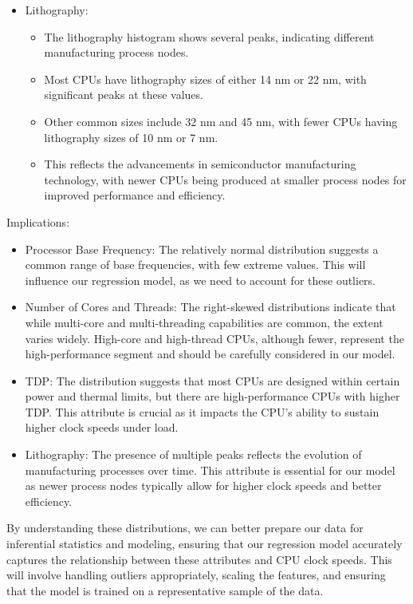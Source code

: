 \begin{itemize}
    \item Lithography: 
    \begin{itemize}
        \item The lithography histogram shows several peaks, indicating different manufacturing process nodes.
        \item Most CPUs have lithography sizes of either 14 nm or 22 nm, with significant peaks at these values. 
        \item Other common sizes include 32 nm and 45 nm, with fewer CPUs having lithography sizes of 10 nm or 7 nm.
        \item This reflects the advancements in semiconductor manufacturing technology, with newer CPUs being produced at smaller process nodes for improved performance and efficiency.
    \end{itemize}

\end{itemize}

Implications:
\begin{itemize}
    \item Processor Base Frequency: The relatively normal distribution suggests a common range of base frequencies, with few extreme values. This will influence our regression model, as we need to account for these outliers.

    \item Number of Cores and Threads: The right-skewed distributions indicate that while multi-core and multi-threading capabilities are common, the extent varies widely. High-core and high-thread CPUs, although fewer, represent the high-performance segment and should be carefully considered in our model.

    \item TDP: The distribution suggests that most CPUs are designed within certain power and thermal limits, but there are high-performance CPUs with higher TDP. This attribute is crucial as it impacts the CPU's ability to sustain higher clock speeds under load.

    \item Lithography: The presence of multiple peaks reflects the evolution of manufacturing processes over time. This attribute is essential for our model as newer process nodes typically allow for higher clock speeds and better efficiency.
\end{itemize}
By understanding these distributions, we can better prepare our data for inferential statistics and modeling, ensuring that our regression model accurately captures the relationship between these attributes and CPU clock speeds. This will involve handling outliers appropriately, scaling the features, and ensuring that the model is trained on a representative sample of the data.

